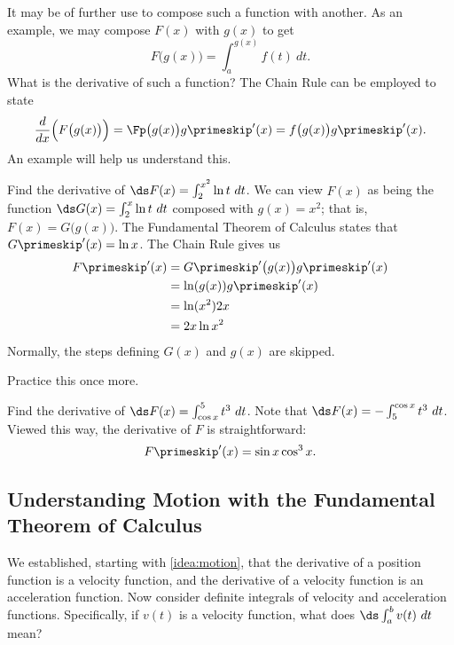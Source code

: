 It may be of further use to compose such a function with another. As an example, we may compose $F(x)$ with $g(x)$ to get
\[F\big(g(x)\big) = \int_a^{g(x)} f(t)\ dt.\]
What is the derivative of such a function? The Chain Rule can be employed to state
\[
\frac{d}{dx}\Big(F\big(g(x)\big)\Big) = \Fp\big(g(x)\big)g\primeskip'(x)
= f\big(g(x)\big)g\primeskip'(x).
\]
An example will help us understand this.

\begin{example}\label{ex_ftc11}
Find the derivative of $\ds F(x) = \int_2^{x^2} \ln t\ dt$.
\solution
We can view $F(x)$ as being the function $\ds G(x) = \int_2^x \ln t\ dt$ composed with $g(x) = x^2$; that is, $F(x) = G\big(g(x)\big)$. The Fundamental Theorem of Calculus states that $G\primeskip'(x) = \ln x$. The Chain Rule gives us 
\begin{align*}
F\primeskip'(x) &= G\primeskip'\big(g(x)\big) g\primeskip'(x) \\
 			&= \ln (g(x)) g\primeskip'(x) \\
 			&= \ln (x^2) 2x \\
 			&=2x\ln x^2
\end{align*}
Normally, the steps defining $G(x)$ and $g(x)$ are skipped.
\end{example}

Practice this once more.

\begin{example}\label{ex_ftc12}
Find the derivative of $\ds F(x) = \int_{\cos x}^5 t^3\ dt$.
\solution
Note that $\ds F(x) = -\int_5^{\cos x} t^3\ dt$. Viewed this way, the derivative of $F$ is straightforward:
\[F\primeskip'(x) = \sin x \cos^3 x.\]
\end{example}

\subsection{Understanding Motion with the Fundamental Theorem of Calculus}

We established, starting with \autoref{idea:motion}, that the derivative of a position function is a velocity function, and the derivative of a velocity function is an acceleration function. Now consider definite integrals of velocity and acceleration functions. Specifically, if $v(t)$ is a velocity function, what does $\ds \int_a^b v(t)\ dt$ mean?

